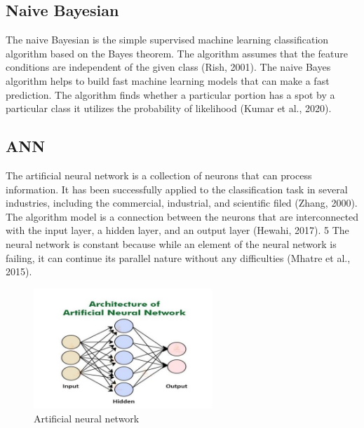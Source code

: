 \documentclass{article}
\begin{document}
\subsection{Naive Bayesian}


The naive Bayesian is the simple supervised machine learning
classification algorithm based on the Bayes theorem. The algorithm
assumes that the feature conditions are independent of the given class
(Rish, 2001). The naive Bayes algorithm helps to build fast machine
learning models that can make a fast prediction. The algorithm finds
whether a particular portion has a spot by a particular class it utilizes
the probability of likelihood (Kumar et al., 2020).



\subsection{ANN}
The artificial neural network is a collection of neurons that can process
information. It has been successfully applied to the classification task
in several industries, including the commercial, industrial, and
scientific filed (Zhang, 2000). The algorithm model is a connection
between the neurons that are interconnected with the input layer, a
hidden layer, and an output layer (Hewahi, 2017).
5
The neural network is constant because while an element of the neural
network is failing, it can continue its parallel nature without any
difficulties (Mhatre et al., 2015).

\begin{figure}[h!]
  \centering
  \includegraphics[width=0.6\textwidth]{ANN.jpg}
  \caption{Artificial neural network}
\end{figure}
\end{document}
